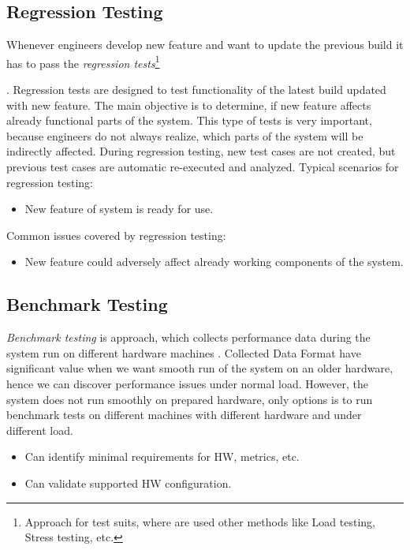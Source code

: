 \subsection*{Regression Testing}
Whenever engineers develop new feature and want to update the previous build it has to pass the \emph{regression tests}\footnote{Approach for test suits, where are used other methods like Load testing, Stress testing, etc.}\addtocounter{footnote}{-1}\addtocounter{Hfootnote}{-1} \cite{STF:REGRESSION}. Regression tests are designed to test functionality of the latest build updated with new feature. The main objective is to determine, if new feature affects already functional parts of the system. This type of tests is very important, because engineers do not always realize, which parts of the system will be indirectly affected. During regression testing, new test cases are not created, but previous test cases are automatic re-executed and analyzed.
Typical scenarios for regression testing:
\begin{itemize}
	\setlength\itemsep{0em}
	\item New feature of system is ready for use.
\end{itemize}
Common issues covered by regression testing:
\begin{itemize}
	\setlength\itemsep{0em}
	\item New feature could adversely affect already working components of the system.
\end{itemize}


\subsection*{Benchmark Testing}
\emph{Benchmark testing}\footnotemark{} is approach, which collects performance data during the system run on different hardware machines \cite{Aho:Benchmarking}. Collected Data Format have significant value when we want smooth run of the system on an older hardware, hence we can discover performance issues under normal load. However, the system does not run smoothly on prepared hardware, only options is to run benchmark tests on different machines with different hardware and under different load.

\begin{itemize}
	\item Can identify minimal requirements for HW, metrics, etc.
	\item Can validate supported HW configuration.
\end{itemize}




